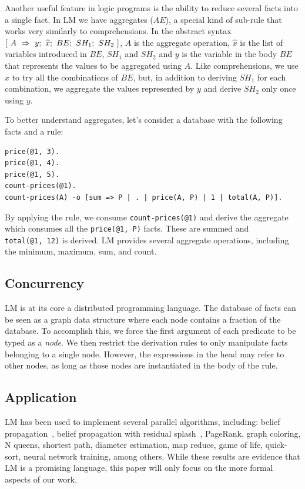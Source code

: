 Another useful feature in logic programs is the ability to reduce several facts into a single fact.
In LM we have aggregates ($AE$), a special kind of sub-rule that works very similarly to comprehensions.
In the abstract syntax $[~A~\Rightarrow~y;~\widehat{x};~BE;~SH_1;~SH_2~]$, $A$ is the aggregate operation, $\widehat{x}$ is the list of variables
introduced in $BE$, $SH_1$ and $SH_2$ and $y$ is the variable in the body
$BE$ that represents the values to be aggregated using $A$. Like comprehensions,
we use $\widehat{x}$ to try all the combinations of $BE$, but, in addition to deriving $SH_1$ for each combination,
we aggregate the values represented by $y$ and derive $SH_2$ only once using $y$.

To better understand aggregates, let's consider a database with the following facts and a rule:

\begin{Verbatim}
price(@1, 3).
price(@1, 4).
price(@1, 5).
count-prices(@1).
count-prices(A) -o [sum => P | . | price(A, P) | 1 | total(A, P)].
\end{Verbatim}

By applying the rule, we consume \texttt{count-prices(@1)} and
derive the aggregate which consumes all the \texttt{price(@1, P)} facts.
These are summed and \texttt{total(@1,~12)} is derived.  
LM provides several aggregate operations, including the minimum, maximum, sum, and count.

\subsection{Concurrency}

LM is at its core a distributed programming language.
The database of facts can be seen as a graph data structure where each node contains a fraction of the database.
To accomplish this, we force the first argument of each predicate to be typed as a \emph{node}. We then
restrict the derivation rules to only manipulate facts belonging to a single node.
However, the expressions in the head may refer to other nodes, as long as those nodes are instantiated in the body of the rule.

\subsection{Application}

LM has been used to implement several parallel algorithms, including: belief propagation~\cite{Gonzalez+al:aistats09paraml},
belief propagation with residual splash~\cite{Gonzalez+al:aistats09paraml}, PageRank, graph coloring,
N queens, shortest path, diameter estimation, map reduce, game of life, quick-sort, neural network training, among others.
While these results are evidence that LM is a promising language, this paper will only focus on the more formal aspects of our work.

